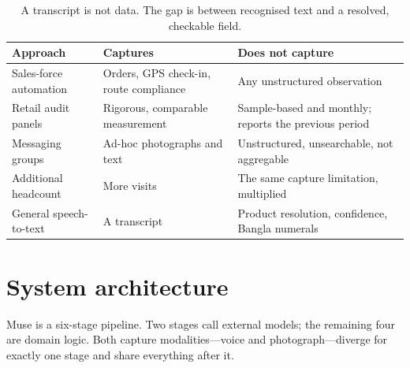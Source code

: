 \documentclass[11pt,a4paper]{article}
\begin{document}
\begin{table}[h]
\centering\small
\begin{tabular}{@{}p{3.4cm} p{4.6cm} p{6.2cm}@{}}
\toprule
\textbf{Approach} & \textbf{Captures} & \textbf{Does not capture} \\
\midrule
Sales-force automation & Orders, GPS check-in, route compliance & Any unstructured observation \\
Retail audit panels & Rigorous, comparable measurement & Sample-based and monthly; reports the previous period \\
Messaging groups & Ad-hoc photographs and text & Unstructured, unsearchable, not aggregable \\
Additional headcount & More visits & The same capture limitation, multiplied \\
General speech-to-text & A transcript & Product resolution, confidence, Bangla numerals \\
\bottomrule
\end{tabular}
\caption{A transcript is not data. The gap is between recognised text and a resolved, checkable field.}
\end{table}

\section{System architecture}

Muse is a six-stage pipeline. Two stages call external models; the remaining
four are domain logic. Both capture modalities---voice and photograph---diverge
for exactly one stage and share everything after it.
\end{document}

